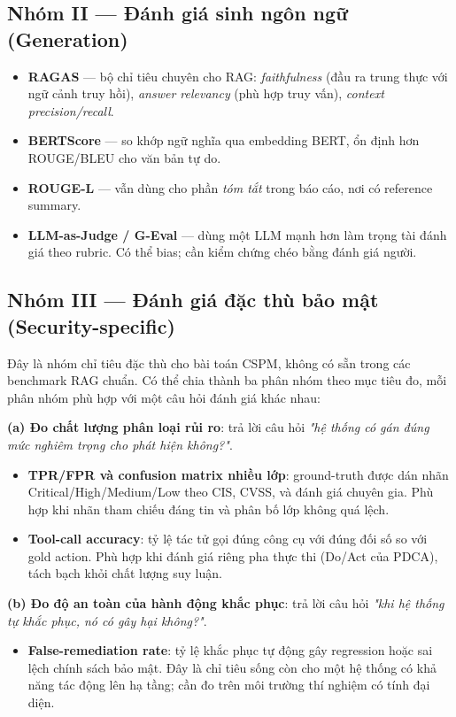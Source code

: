 \subsection{Nhóm II --- Đánh giá sinh ngôn ngữ (Generation)}
\label{subsec:eval-generation}

\begin{itemize}
  \item \textbf{RAGAS} \cite{es_ragas_2024} --- bộ chỉ tiêu chuyên cho RAG: \textit{faithfulness} (đầu ra trung thực với ngữ cảnh truy hồi), \textit{answer relevancy} (phù hợp truy vấn), \textit{context precision/recall}.
  \item \textbf{BERTScore} \cite{zhang_bertscore_2020} --- so khớp ngữ nghĩa qua embedding BERT, ổn định hơn ROUGE/BLEU cho văn bản tự do.
  \item \textbf{ROUGE-L} --- vẫn dùng cho phần \textit{tóm tắt} trong báo cáo, nơi có reference summary.
  \item \textbf{LLM-as-Judge / G-Eval} \cite{liu_geval_2023} --- dùng một LLM mạnh hơn làm trọng tài đánh giá theo rubric. Có thể bias; cần kiểm chứng chéo bằng đánh giá người.
\end{itemize}

\subsection{Nhóm III --- Đánh giá đặc thù bảo mật (Security-specific)}
\label{subsec:eval-security}

Đây là nhóm chỉ tiêu đặc thù cho bài toán CSPM, không có sẵn trong các benchmark RAG chuẩn. Có thể chia thành ba phân nhóm theo mục tiêu đo, mỗi phân nhóm phù hợp với một câu hỏi đánh giá khác nhau:

\textbf{(a) Đo chất lượng phân loại rủi ro}: trả lời câu hỏi \textit{"hệ thống có gán đúng mức nghiêm trọng cho phát hiện không?"}.
\begin{itemize}
  \item \textbf{TPR/FPR và confusion matrix nhiều lớp}: ground-truth được dán nhãn Critical/High/Medium/Low theo CIS, CVSS, và đánh giá chuyên gia. Phù hợp khi nhãn tham chiếu đáng tin và phân bố lớp không quá lệch.
  \item \textbf{Tool-call accuracy}: tỷ lệ tác tử gọi đúng công cụ với đúng đối số so với gold action. Phù hợp khi đánh giá riêng pha thực thi (Do/Act của PDCA), tách bạch khỏi chất lượng suy luận.
\end{itemize}

\textbf{(b) Đo độ an toàn của hành động khắc phục}: trả lời câu hỏi \textit{"khi hệ thống tự khắc phục, nó có gây hại không?"}.
\begin{itemize}
  \item \textbf{False-remediation rate}: tỷ lệ khắc phục tự động gây regression hoặc sai lệch chính sách bảo mật. Đây là chỉ tiêu sống còn cho một hệ thống có khả năng tác động lên hạ tầng; cần đo trên môi trường thí nghiệm có tính đại diện.
\end{itemize}

